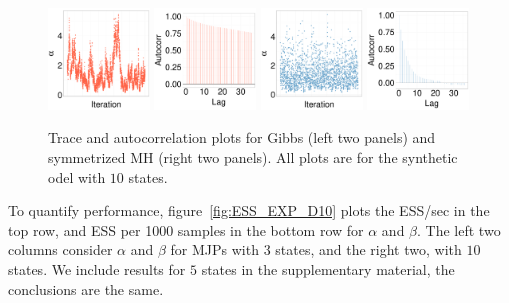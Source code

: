   \begin{figure}[H]
  \centering
  \begin{minipage}[!hp]{0.97\linewidth}
    \includegraphics [width=0.24\textwidth, angle=0]{figs/EXP_ks/exp_traceGBS_44_05_10_.pdf}
    \includegraphics [width=0.24\textwidth, angle=0]{figs/EXP_ks/exp_gbsacf_44_05_10_.pdf}
    \includegraphics [width=0.24\textwidth, angle=0]{figs/EXP_ks/exp_traceMH_44_05_10_.pdf}
    \includegraphics [width=0.24\textwidth, angle=0]{figs/EXP_ks/exp_mhacf_44_05_10_.pdf}
  \end{minipage}
  \caption{Trace and autocorrelation plots for Gibbs (left two panels) and symmetrized MH (right two panels). All plots are for the synthetic odel with $10$ states.}
     \label{fig:TRACE_EXP}
  \end{figure}
  To quantify performance, figure~\ref{fig:ESS_EXP_D10} plots the ESS/sec in the top row, and ESS per 1000 samples in the bottom row for $\alpha$  and $\beta$. 
  The left two columns consider $\alpha$ and $\beta$ for MJPs with $3$ states, and the right two, with $10$ states. 
  We include results for $5$ states in the supplementary material, the conclusions are the same. 
